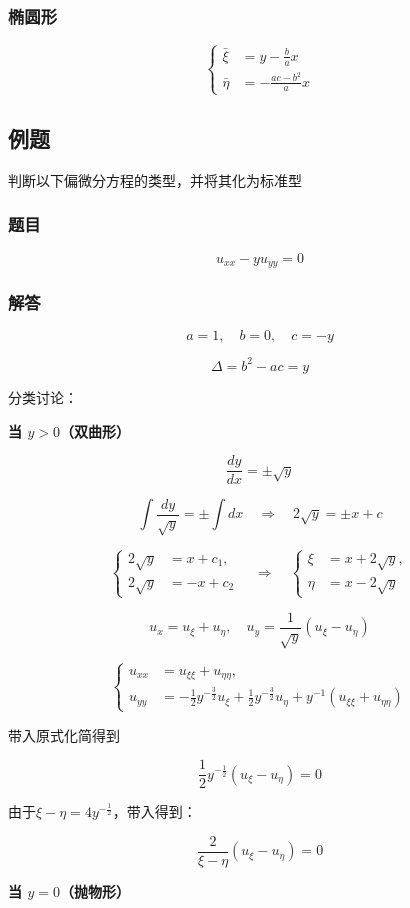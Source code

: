 \subsubsection{椭圆形}

\[
\left\{
\begin{aligned}
\bar{\xi} &= y - \frac{b}{a} x \\
\bar{\eta} &= -\frac{ac-b^2}{a} x
\end{aligned}
\right.
\]

\subsection{例题}
判断以下偏微分方程的类型，并将其化为标准型

\subsubsection*{题目}
\[
u_{xx} - y u_{yy} = 0
\]

\subsubsection*{解答}

\[
a = 1, \quad b = 0, \quad c = -y
\]

\[
\Delta = b^2 - ac = y
\]

分类讨论：

\textbf{当 $y > 0$（双曲形）}

\[
\frac{dy}{dx} = \pm \sqrt{y}
\]

\[
\int \frac{dy}{\sqrt{y}} = \pm \int dx \quad \Longrightarrow \quad 2\sqrt{y} = \pm x + c
\]

\[
\left\{
\begin{aligned}
2\sqrt{y} &= x + c_1, \\
2\sqrt{y} &= -x + c_2
\end{aligned}
\right.
\quad \Longrightarrow \quad
\left\{
\begin{aligned}
\xi &= x + 2\sqrt{y}, \\
\eta &= x - 2\sqrt{y}
\end{aligned}
\right.
\]

\[
u_x = u_{\xi} + u_{\eta}, \quad u_y = \frac{1}{\sqrt{y}} ( u_{\xi} - u_{\eta} )
\]

\[
\left\{
\begin{aligned}
u_{xx} &= u_{\xi \xi} + u_{\eta \eta}, \\
u_{yy} &= -\frac{1}{2} y^{- \frac{3}{2}} u_{\xi} + \frac{1}{2} y^{-\frac{3}{2}} u_{\eta} + y^{-1} (u_{\xi \xi} + u_{\eta \eta})
\end{aligned}
\right.
\]

带入原式化简得到

\[
\frac{1}{2} y^{-\frac{1}{2}} (u_{\xi} - u_{\eta}) = 0
\]

由于\(\xi - \eta = 4y^{-\frac{1}{2}}\)，带入得到：

\[
\frac{2}{\xi - \eta} (u_{\xi} - u_{\eta}) = 0
\]

\textbf{当 $y = 0$（抛物形）}